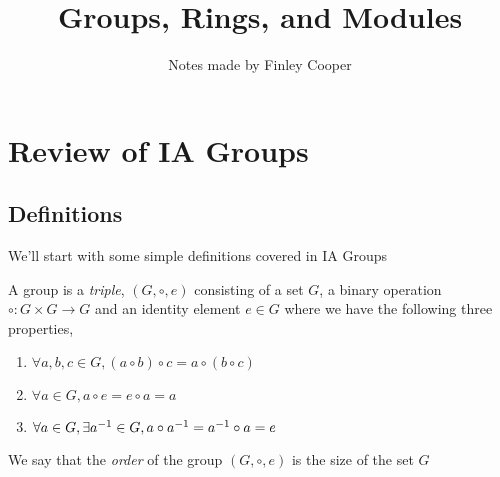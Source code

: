\documentclass{article}
\title{Groups, Rings, and Modules}
\author{Notes made by Finley Cooper}
\begin{document}
  \maketitle
  \newpage
  \tableofcontents
  \newpage
  \section{Review of IA Groups}
  \subsection{Definitions}
  We'll start with some simple definitions covered in IA Groups
  \begin{definition}
	  A group is a \textit{triple}, $ (G,\circ,e) $ consisting of a set $ G $, a binary operation $ \circ:G\times G\rightarrow G $ and an identity element $ e\in G $ where we have the following three properties,
          \begin{enumerate}	  
		  \item $ \forall a,b,c\in G, (a\circ b) \circ c =a\circ(b\circ c) $
	          \item $ \forall a\in G, a\circ e = e\circ a = a $
		  \item $ \forall a\in G, \exists {a}^{-1} \in G, a \circ {a}^{-1} = {a}^{-1} \circ a = e $
          \end{enumerate}
  We say that the \textit{order} of the group $ (G,\circ, e) $ is the size of the set $ G $	
  \end{definition}
\end{document}

